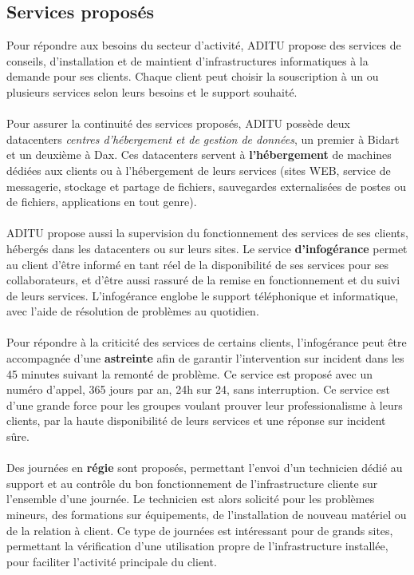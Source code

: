 \subsection{Services proposés}

Pour répondre aux besoins du secteur d'activité, ADITU propose des services de conseils, d'installation et de maintient d'infrastructures informatiques à la demande pour ses clients. Chaque client peut choisir la souscription à un ou plusieurs services selon leurs besoins et le support souhaité.
\\ \\
Pour assurer la continuité des services proposés, ADITU possède deux datacenters \textit{centres d'hébergement et de gestion de données}, un premier à Bidart et un deuxième à Dax. Ces datacenters servent à \textbf{l'hébergement} de machines dédiées aux clients ou à l'hébergement de leurs services (sites WEB, service de messagerie, stockage et partage de fichiers, sauvegardes externalisées de postes ou de fichiers, applications en tout genre).
\\ \\
ADITU propose aussi la supervision du fonctionnement des services de ses clients, hébergés dans les datacenters ou sur leurs sites. Le service \textbf{d'infogérance} permet au client d'être informé en tant réel de la disponibilité de ses services pour ses collaborateurs, et d'être aussi rassuré de la remise en fonctionnement et du suivi de leurs services. L'infogérance englobe le support téléphonique et informatique, avec l'aide de résolution de problèmes au quotidien.
\\ \\
Pour répondre à la criticité des services de certains clients, l'infogérance peut être accompagnée d'une \textbf{astreinte} afin de garantir l'intervention sur incident dans les 45 minutes suivant la remonté de problème. Ce service est proposé avec un numéro d'appel, 365 jours par an, 24h sur 24, sans interruption. Ce service est d'une grande force pour les groupes voulant prouver leur professionalisme à leurs clients, par la haute disponibilité de leurs services et une réponse sur incident sûre.
\\ \\
Des journées en \textbf{régie} sont proposés, permettant l'envoi d'un technicien dédié au support et au contrôle du bon fonctionnement de l'infrastructure cliente sur l'ensemble d'une journée. Le technicien est alors solicité pour les problèmes mineurs, des formations sur équipements, de l'installation de nouveau matériel ou de la relation à client. Ce type de journées est intéressant pour de grands sites, permettant la vérification d'une utilisation propre de l'infrastructure installée, pour faciliter l'activité principale du client.

